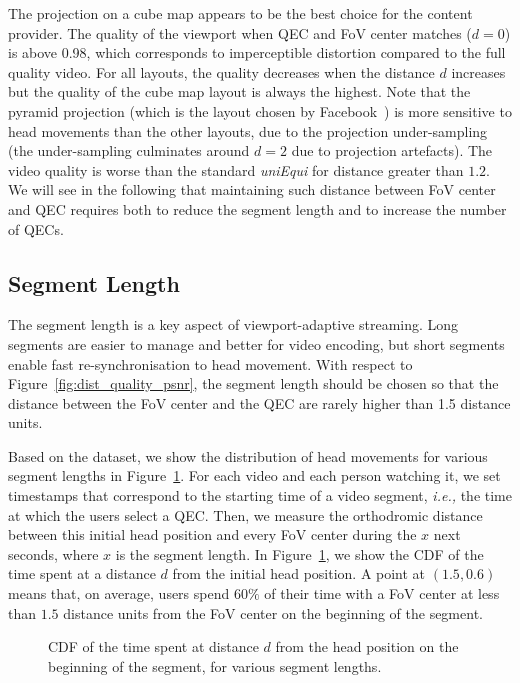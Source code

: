 The projection on a cube map appears to be the best choice for the content provider. The quality of
the viewport when QEC and FoV center matches ($d=0$) is above 0.98, which corresponds to imperceptible distortion compared to the full quality video. For all layouts, the quality
decreases when the distance $d$ increases but the quality of the cube map layout is always the 
highest. Note that the pyramid projection (which is the layout chosen
by Facebook~\cite{facebook}) is more sensitive to head movements than
the other layouts, due to the projection under-sampling (the under-sampling culminates around 
$d=2$ due to projection artefacts). The video quality is worse than
the standard \emph{uniEqui} for distance greater than $1.2$. We will see in the following that
maintaining such distance between FoV center and QEC requires both to
reduce the segment length and to increase the number of QECs.

\subsection{Segment Length}

The segment length is a key
aspect of viewport-adaptive streaming. Long segments are easier to manage and better for video encoding,
but short segments enable fast re-synchronisation to head movement. With respect to
Figure~\ref{fig:dist_quality_psnr}, the
segment length should be chosen so that the
distance between the FoV center and the QEC are rarely higher than 1.5 distance units.

Based on the dataset, we show the distribution of head movements for various segment lengths
in Figure~\ref{cdf-dataset}. For each video and each person watching
it, we set timestamps that correspond to the starting time of a video
segment, \textit{i.e.,} the time at which the users select a QEC. Then, we measure the orthodromic distance
between this initial head position and every FoV center during the $x$
next seconds, where $x$ is the segment length. In
Figure~\ref{cdf-dataset}, we show the \ac{CDF} of the time spent at a
distance $d$ from the initial head position. A point at $(1.5,0.6)$
means that, on average, users spend $60\%$ of their time with a FoV
center at less than $1.5$ distance units from the FoV center on the
beginning of the segment.

\begin{figure}[htbp]
\centering

\caption{CDF of the time spent at distance $d$ from the head position on the beginning of the
segment, for various segment lengths.}\label{cdf-dataset}
\end{figure}

